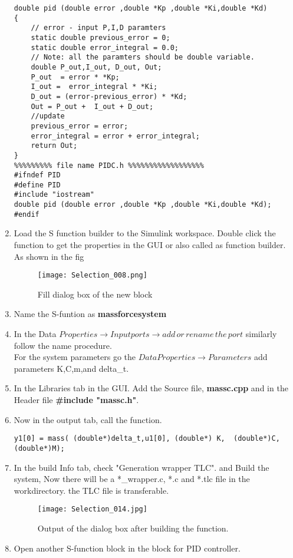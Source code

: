 \documentclass{article}
\begin{document}
\begin{enumerate}
\begin{verbatim}
double pid (double error ,double *Kp ,double *Ki,double *Kd)
{   
    // error - input P,I,D paramters
    static double previous_error = 0;
    static double error_integral = 0.0;
    // Note: all the paramters should be double variable.
    double P_out,I_out, D_out, Out;
    P_out  = error * *Kp;
    I_out =  error_integral * *Ki;
    D_out = (error-previous_error) * *Kd;
    Out = P_out +  I_out + D_out;
    //update
    previous_error = error;
    error_integral = error + error_integral;
    return Out;
} 
%%%%%%%%% file name PIDC.h %%%%%%%%%%%%%%%%%%
#ifndef PID
#define PID
#include "iostream"
double pid (double error ,double *Kp ,double *Ki,double *Kd);
#endif
\end{verbatim}
\item Load the S function builder to the Simulink workspace. Double click the function to get the properties in the GUI or also called as function builder. As shown in the fig 
\begin{figure}[H]
    \centering
    \texttt{[image: Selection\_008.png]}
    \caption{Fill dialog box of the new block}
    \label{fig:blank}
\end{figure}
\item Name the S-funtion as \textbf{massforcesystem}
\item In the Data $Properties \to Input ports \to add\, or\, rename\, the\, port$ similarly follow the name procedure. \\ 
For the system parameters go the $Data Properties \to Parameters$
add parameters K,C,m,and delta\_t.
\item In the Libraries tab in the GUI. Add the Source file, \textbf{massc.cpp} and in the Header file \textbf{#include "massc.h"}.
\item Now in the output tab, call the function.
\begin{verbatim}
y1[0] = mass( (double*)delta_t,u1[0], (double*) K,  (double*)C,  (double*)M);
\end{verbatim}
\item In the build Info tab, check "Generation wrapper TLC". and Build the system, Now there will be a *\_wrapper.c, *.c and *.tlc file in the workdirectory. the TLC file is transferable.
\begin{figure}[H]
    \centering
    \texttt{[image: Selection\_014.jpg]}
    \caption{Output of the dialog box after building the function.}
    \label{fig:outputmass}
\end{figure}
\item Open another S-function block in the block for PID controller.

\end{enumerate}
\end{document}
